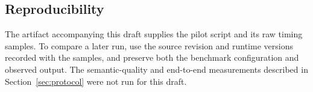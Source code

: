 \subsection{Reproducibility}
The artifact accompanying this draft supplies the pilot script and its raw timing samples. To compare a later run, use the source revision and runtime versions recorded with the samples, and preserve both the benchmark configuration and observed output. The semantic-quality and end-to-end measurements described in Section~\ref{sec:protocol} were not run for this draft.
